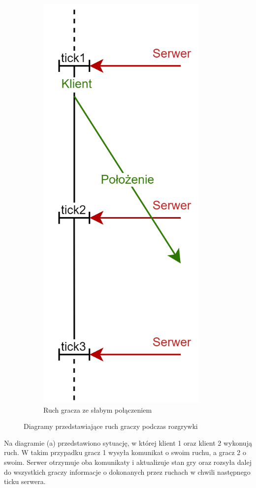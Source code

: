 \documentclass{article}
\begin{document}
\begin{itemize}
\begin{figure}[h]
\begin{subfigure}{.5\textwidth}
          \includegraphics[scale=0.30]{ruch2.png}
          \caption{Ruch gracza ze słabym połączeniem}
          \label{fig:sub2}
        \end{subfigure}
        \caption{Diagramy przedstawiające ruch graczy podczas rozgrywki}
        \label{fig:test}
        \end{figure}

        Na diagramie (a) przedstawiono sytuację, w której klient 1 oraz klient 2 wykonują ruch. W takim przypadku
gracz 1 wysyła komunikat o swoim ruchu, a gracz 2 o swoim. Serwer otrzymuje oba komunikaty i aktualizuje
stan gry oraz rozsyła dalej do wszystkich graczy informacje o dokonanych przez ruchach w chwili następnego ticku serwera.


\end{itemize}
\end{document}
